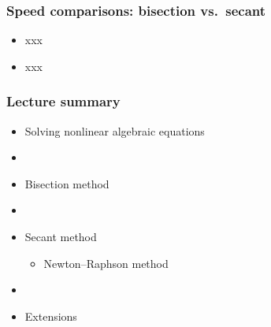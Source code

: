 \documentclass[english,14pt]{beamer}
\begin{document}

\begin{frame}[fragile]

\frametitle{Speed comparisons: bisection vs.~secant}

\begin{itemize}
	\item xxx
	\item xxx
\end{itemize}

\end{frame}

%
%
%
%


\begin{frame}[fragile]

\frametitle{Lecture summary}
\begin{itemize}
	\item Solving nonlinear algebraic equations

	\item[]
	
	\item Bisection method

	\item[]
	
	\item Secant method
	\begin{itemize}
		\item Newton--Raphson method
	\end{itemize}

	\item[]
	
	\item Extensions
	
\end{itemize}

\end{frame}

\end{document}
